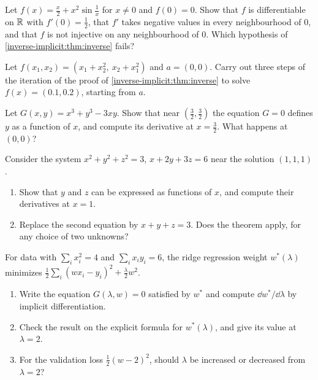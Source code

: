 \begin{notechapter}
\begin{exercise}\label{inverse-implicit:exr:2}
Let $f(x) = \frac x2 + x^2\sin\frac1x$ for $x\neq0$ and $f(0) = 0$. Show
that $f$ is differentiable on $\mathbb{R}$ with $f'(0) = \frac12$, that $f'$ takes
negative values in every neighbourhood of $0$, and that $f$ is not
injective on any neighbourhood of $0$. Which hypothesis of
\cref{inverse-implicit:thm:inverse} fails?
\end{exercise}

\begin{exercise}\label{inverse-implicit:exr:3}
Let $f(x_1, x_2) = (x_1 + x_2^2,\ x_2 + x_1^2)$ and $a = (0, 0)$. Carry
out three steps of the iteration of the proof of
\cref{inverse-implicit:thm:inverse} to solve $f(x) = (0.1, 0.2)$, starting
from $a$.
\end{exercise}

\begin{exercise}\label{inverse-implicit:exr:4}
Let $G(x, y) = x^3 + y^3 - 3xy$. Show that near
$(\frac32, \frac32)$ the equation $G = 0$ defines $y$ as a function of
$x$, and compute its derivative at $x = \frac32$. What happens at
$(0, 0)$?
\end{exercise}

\begin{exercise}\label{inverse-implicit:exr:5}
Consider the system $x^2 + y^2 + z^2 = 3$, $x + 2y + 3z = 6$ near the
solution $(1, 1, 1)$.
\begin{enumerate}[nosep]
  \item Show that $y$ and $z$ can be expressed as functions of $x$, and
        compute their derivatives at $x = 1$.
  \item Replace the second equation by $x + y + z = 3$. Does the theorem
        apply, for any choice of two unknowns?
\end{enumerate}
\end{exercise}

\begin{exercise}\label{inverse-implicit:exr:6}
For data with $\sum_ix_i^2 = 4$ and $\sum_ix_iy_i = 6$, the ridge
regression weight $w^*(\lambda)$ minimizes
$\frac12\sum_i(wx_i - y_i)^2 + \frac\lambda2w^2$.
\begin{enumerate}[nosep]
  \item Write the equation $G(\lambda, w) = 0$ satisfied by $w^*$ and
        compute $\dd w^*/\dd\lambda$ by implicit differentiation.
  \item Check the result on the explicit formula for $w^*(\lambda)$, and
        give its value at $\lambda = 2$.
  \item For the validation loss $\frac12(w - 2)^2$, should $\lambda$ be
        increased or decreased from $\lambda = 2$?
\end{enumerate}
\end{exercise}


\end{notechapter}
